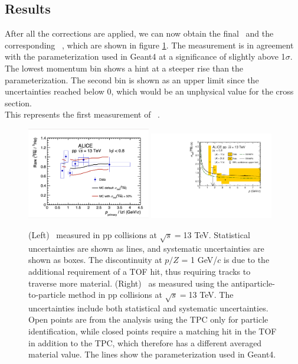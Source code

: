\subsection{Results}
After all the corrections are applied, we can now obtain the final \ratio\ and the corresponding \sigmainel\ , which are shown in figure \ref{fig:Ahe_sigma_inel_pp}. The measurement is in agreement with the parameterization used in Geant4 at a significance of slightly above 1$\sigma$. The lowest momentum bin shows a hint at a steeper rise than the parameterization. The second bin is shown as an upper limit since the uncertainties reached below 0, which would be an unphysical value for the cross section. \\

This represents the first measurement of \sigmainel\ .
\begin{figure}
    \centering
    \includegraphics[width=0.48\textwidth]{figures/he3bar_he3_ratio.png}
    \includegraphics[width=0.48\textwidth]{figures/Antihelium_inelastic_cross_section.pdf}
    \caption{(Left) \ratio\ measured in pp collisions at $\sqrt{s}=$13 TeV. Statistical uncertainties are shown as lines, and systematic uncertainties are shown as boxes. The discontinuity at $p/Z$ = 1 GeV/$c$ is due to the additional requirement of a TOF hit, thus requiring tracks to traverse more material. (Right) \sigmainel\ as measured using the antiparticle-to-particle method in pp collisions at $\sqrt{s}=$13 TeV. The uncertainties include both statistical and systematic uncertainties. Open points are from the analysis using the TPC only for particle identification, while closed points require a matching hit in the TOF in addition to the TPC, which therefore has a different averaged material value. The lines show the parameterization used in Geant4.}
    \label{fig:Ahe_sigma_inel_pp}
\end{figure}

